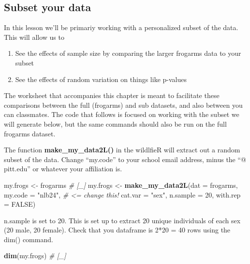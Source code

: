 \documentclass[]{book}
\newenvironment{Shaded}{\begin{snugshade}}{\end{snugshade}}
\newcommand{\KeywordTok}[1]{\textcolor[rgb]{0.13,0.29,0.53}{\textbf{#1}}}
\newcommand{\DataTypeTok}[1]{\textcolor[rgb]{0.13,0.29,0.53}{#1}}
\newcommand{\DecValTok}[1]{\textcolor[rgb]{0.00,0.00,0.81}{#1}}
\newcommand{\StringTok}[1]{\textcolor[rgb]{0.31,0.60,0.02}{#1}}
\newcommand{\CommentTok}[1]{\textcolor[rgb]{0.56,0.35,0.01}{\textit{#1}}}
\newcommand{\OtherTok}[1]{\textcolor[rgb]{0.56,0.35,0.01}{#1}}
\newcommand{\NormalTok}[1]{#1}
\providecommand{\tightlist}{%
  \setlength{\itemsep}{0pt}\setlength{\parskip}{0pt}}
\theoremstyle{definition}
\theoremstyle{definition}
\theoremstyle{definition}
\theoremstyle{remark}
\begin{document}
\subsection{Subset your data}\label{subset-your-data}

In this lesson we'll be primariy working with a personalized subset of
the data. This will allow us to

\begin{enumerate}
\def\labelenumi{\arabic{enumi}.}
\tightlist
\item
  See the effects of sample size by comparing the larger frogarms data
  to your subset
\item
  See the effects of random variation on things like p-values
\end{enumerate}

The worksheet that accompanies this chapter is meant to facilitate these
comparisons between the full (frogarms) and sub datasets, and also
between you can classmates. The code that follows is focused on working
with the subset we will generate below, but the same commands should
also be run on the full frogarms dataset.

The function \textbf{make\_my\_data2L()} in the wildlfieR will extract
out a random subset of the data. Change ``my.code'' to your school email
address, minus the ``@ pitt.edu'' or whatever your affiliation is.

\begin{Shaded}
\begin{Highlighting}[]
\NormalTok{my.frogs <-}\StringTok{ }\NormalTok{frogarms }\CommentTok{# [_]}
\NormalTok{my.frogs <-}\StringTok{ }\KeywordTok{make_my_data2L}\NormalTok{(}\DataTypeTok{dat =}\NormalTok{ frogarms,}
                           \DataTypeTok{my.code =} \StringTok{"nlb24"}\NormalTok{, }\CommentTok{# <=  change this!}
                           \DataTypeTok{cat.var =} \StringTok{"sex"}\NormalTok{,}
                           \DataTypeTok{n.sample =} \DecValTok{20}\NormalTok{,}
                           \DataTypeTok{with.rep =} \OtherTok{FALSE}\NormalTok{)}
\end{Highlighting}
\end{Shaded}

n.sample is set to 20. This is set up to extract 20 unique individuals
of each sex (20 male, 20 female). Check that you dataframe is 2*20 = 40
rows using the dim() command.

\begin{Shaded}
\begin{Highlighting}[]
\KeywordTok{dim}\NormalTok{(my.frogs) }\CommentTok{# [_]}
\end{Highlighting}
\end{Shaded}
\end{document}

